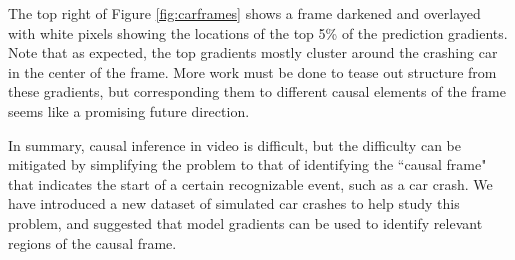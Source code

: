 \documentclass[letterpaper, twocolumn]{article} %
\begin{document}
The top right of Figure \ref{fig:carframes} shows a frame darkened and overlayed with white pixels showing the locations of the top 5\% of the prediction gradients. Note that as expected, the top gradients mostly cluster around the crashing car in the center of the frame. More work must be done to tease out structure from these gradients, but corresponding them to different causal elements of the frame seems like a promising future direction.

In summary, causal inference in video is difficult, but the difficulty can be mitigated by simplifying the problem to that of identifying the ``causal frame" that indicates the start of a certain recognizable event, such as a car crash. We have introduced a new dataset of simulated car crashes to help study this problem, and suggested that model gradients can be used to identify relevant regions of the causal frame.










\end{document}
